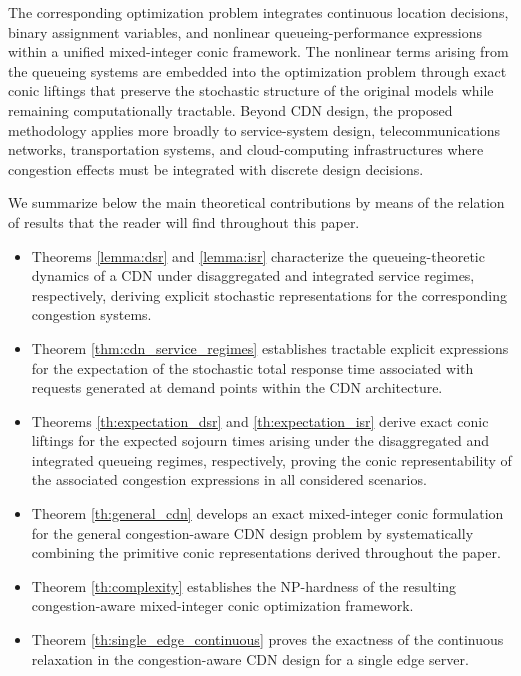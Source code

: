 \documentclass[a4paper,11pt,reqno]{amsart}
\begin{document}
The corresponding optimization problem integrates continuous location decisions, binary assignment variables, and nonlinear queueing-performance expressions within a unified mixed-integer conic framework. The nonlinear terms arising from the queueing systems are embedded into the optimization problem through exact conic liftings that preserve the stochastic structure of the original models while remaining computationally tractable. Beyond CDN design, the proposed methodology applies more broadly to service-system design, telecommunications networks, transportation systems, and cloud-computing infrastructures where congestion effects must be integrated with discrete design decisions.

We summarize below the main theoretical contributions by means of the relation of results that the reader will find throughout this paper.

\begin{itemize}

\item[--] 
Theorems \ref{lemma:dsr} and \ref{lemma:isr} characterize the queueing-theoretic dynamics of a CDN under disaggregated and integrated service regimes, respectively, deriving explicit stochastic representations for the corresponding congestion systems.

\item[--] Theorem \ref{thm:cdn_service_regimes} establishes tractable explicit expressions for the expectation of the stochastic total response time associated with requests generated at demand points within the CDN architecture.

\item[--] 
Theorems \ref{th:expectation_dsr} and \ref{th:expectation_isr} derive exact conic liftings for the expected sojourn times arising under the disaggregated and integrated queueing regimes, respectively, proving the conic representability of the associated congestion expressions in all considered scenarios.

\item[--] Theorem \ref{th:general_cdn} develops an exact mixed-integer conic formulation for the general congestion-aware CDN design problem by systematically combining the primitive conic representations derived throughout the paper.

\item[--] Theorem \ref{th:complexity} establishes the NP-hardness of the resulting congestion-aware mixed-integer conic optimization framework.

\item[--] Theorem \ref{th:single_edge_continuous} proves the exactness of the continuous relaxation in the congestion-aware CDN design for a single edge server.
\end{itemize}
\end{document}
